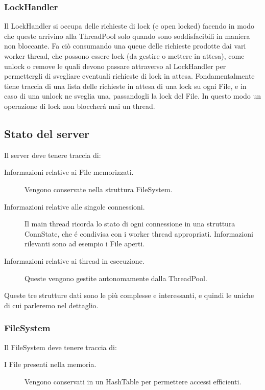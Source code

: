 \documentclass[11pt]{article}
\begin{document}
\begin{flushleft}
\subsubsection{LockHandler}
Il LockHandler si occupa delle richieste di lock (e open locked) facendo in modo che queste arrivino alla ThreadPool solo quando sono soddisfacibili in maniera non bloccante.
Fa ciò consumando una queue delle richieste prodotte dai vari worker thread, che possono essere lock (da gestire o mettere in attesa), come unlock o remove le quali devono passare attraverso al LockHandler per permettergli di svegliare eventuali richieste di lock in attesa.
 Fondamentalmente tiene traccia di una lista delle richieste in attesa di una lock su ogni File, e in caso di una unlock ne sveglia una, passandogli la lock del File. In questo modo un operazione di lock non bloccherá mai un thread.

\subsection{Stato del server}
Il server deve tenere traccia di:
\begin{description}

\item[Informazioni relative ai File memorizzati.] Vengono conservate nella struttura FileSystem.

\item[Informazioni relative alle singole connessioni.] Il main thread ricorda lo stato di ogni connessione in una struttura ConnState, che é condivisa con i worker thread appropriati. Informazioni rilevanti sono ad esempio i File aperti.

\item[Informazioni relative ai thread in esecuzione.] Queste vengono gestite autonomamente dalla ThreadPool.

\end{description}

Queste tre strutture dati sono le più complesse e interessanti, e quindi le uniche di cui parleremo nel dettaglio.

\subsubsection{FileSystem}
Il FileSystem deve tenere traccia di:
\begin{description}

\item[I File presenti nella memoria.] Vengono conservati in un HashTable per permettere accessi efficienti.


\end{description}
\end{flushleft}
\end{document}
